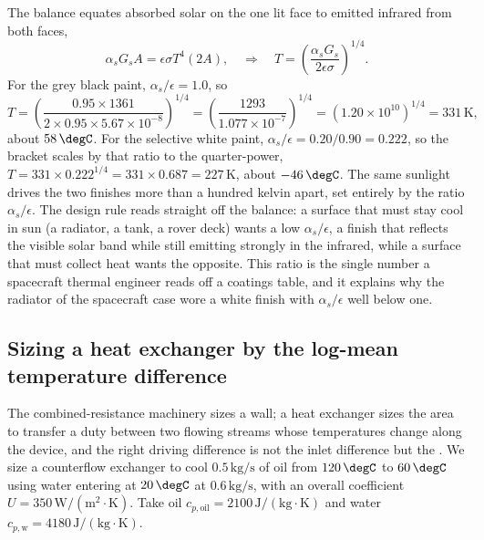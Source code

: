 

The balance equates absorbed solar on the one lit face to emitted infrared
from both faces,
\[
\alpha_s G_s A = \epsilon \sigma T^4 (2A), \quad\Rightarrow\quad
T = \left(\frac{\alpha_s G_s}{2 \epsilon \sigma}\right)^{1/4}.
\]
For the grey black paint, $\alpha_s/\epsilon = 1.0$, so
\[
T = \left(\frac{0.95 \times 1361}{2 \times 0.95 \times 5.67 \times
10^{-8}}\right)^{1/4} = \left(\frac{1293}{1.077 \times 10^{-7}}\right)^{1/4}
= (1.20 \times 10^{10})^{1/4} = 331\,\si{\kelvin},
\]
about $58\,\degC$. For the selective white paint, $\alpha_s/\epsilon =
0.20/0.90 = 0.222$, so the bracket scales by that ratio to the
quarter-power, $T = 331 \times 0.222^{1/4} = 331 \times 0.687 = 227\,
\si{\kelvin}$, about $-46\,\degC$. The same sunlight drives the two
finishes more than a hundred kelvin apart, set entirely by the ratio
$\alpha_s/\epsilon$. The design rule reads straight off the balance: a
surface that must stay cool in sun (a radiator, a tank, a rover deck)
wants a low $\alpha_s/\epsilon$, a finish that reflects the visible solar
band while still emitting strongly in the infrared, while a surface that
must collect heat wants the opposite. This ratio is the single number a
spacecraft thermal engineer reads off a coatings table, and it explains
why the radiator of the spacecraft case wore a white finish with
$\alpha_s/\epsilon$ well below one.

\subsection{Sizing a heat exchanger by the log-mean temperature
difference}

The combined-resistance machinery sizes a wall; a heat exchanger sizes the
area to transfer a duty between two flowing streams whose temperatures
change along the device, and the right driving difference is not the
inlet difference but the . We
size a counterflow exchanger to cool $0.5\,\text{kg/s}$ of oil from
$120\,\degC$ to $60\,\degC$ using water entering at $20\,\degC$ at
$0.6\,\text{kg/s}$, with an overall coefficient $U = 350\,\text{W}/
(\text{m}^2\cdot\si{\kelvin})$. Take oil $c_{p,\text{oil}} = 2100\,\text{J}
/(\text{kg}\cdot\si{\kelvin})$ and water $c_{p,\text{w}} = 4180\,\text{J}/
(\text{kg}\cdot\si{\kelvin})$.

